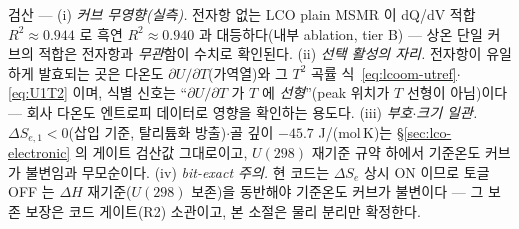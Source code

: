 \begin{verifybox}
검산 --- (i) \emph{커브 무영향(실측).} 전자항 없는 LCO plain MSMR 이 dQ/dV 적합 $R^2\!\approx\!0.944$
로 흑연 $R^2\!\approx\!0.940$ 과 대등하다(내부 ablation, tier B) --- 상온 단일 커브의 적합은 전자항과
\emph{무관}함이 수치로 확인된다. (ii) \emph{선택 활성의 자리.} 전자항이 유일하게 발효되는 곳은 다온도
$\partial U/\partial T$(가역열)와 그 $T^2$ 곡률 식~\eqref{eq:lcoom-utref}$\cdot$\eqref{eq:U1T2} 이며, 식별
신호는 ``$\partial U/\partial T$ 가 $T$ 에 \emph{선형}''(peak 위치가 $T$ 선형이 아님)이다 --- 회사 다온도
엔트로피 데이터로 영향을 확인하는 용도다. (iii) \emph{부호$\cdot$크기 일관.} $\Delta S_{e,1}\!<\!0$(삽입 기준,
탈리튬화 방출)$\cdot$골 깊이 $-45.7$ J/(mol\,K)는 \S\ref{sec:lco-electronic} 의 게이트 검산값 그대로이고,
$U(298)$ 재기준 규약 하에서 기준온도 커브가 불변임과 무모순이다. (iv) \emph{bit-exact 주의.} 현 코드는
$\Delta S_e$ 상시 ON 이므로 토글 OFF 는 $\Delta H$ 재기준($U(298)$ 보존)을 동반해야 기준온도 커브가
불변이다 --- 그 보존 보장은 코드 게이트(R2) 소관이고, 본 소절은 물리 분리만 확정한다.
\end{verifybox}


